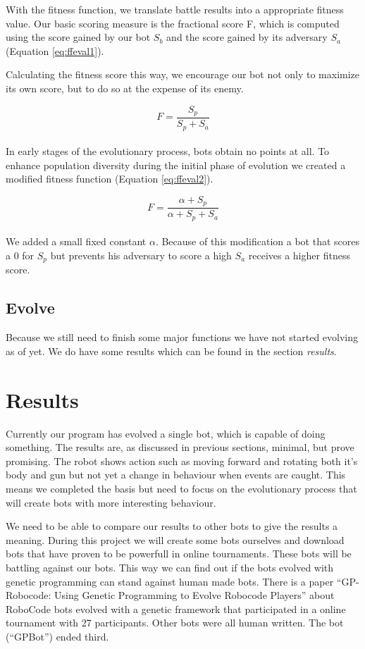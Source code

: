 \documentclass[a4paper,10pt]{article}
\begin{document}
With the fitness function, we translate battle results into a appropriate fitness value. Our basic scoring measure is the fractional score F, which is computed using the score gained by our bot $S_b$ and the score gained by its adversary $S_a$ (Equation \ref{eq:ffeval1}).

Calculating the fitness score this way, we encourage our bot not only to maximize its own score, but to do so at the expense of its enemy.

\begin{equation}
F = \frac{S_p}{S_p + S_a}
    \label{eq:ffeval1}
\end{equation} \\

In early stages of the evolutionary process, bots obtain no points at all. To enhance population diversity during the initial phase of evolution we created a modified fitness function (Equation \ref{eq:ffeval2}).

\begin{equation}
F = \frac{\alpha+S_p}{\alpha+S_p + S_a}
     \label{eq:ffeval2}
\end{equation} \\

We added a small fixed constant $\alpha$. Because of this modification a bot that scores a 0 for $S_p$ but prevents his adversary to score a high $S_a$ receives a higher fitness score.

\subsection{Evolve}
Because we still need to finish some major functions we have not started evolving as of yet. We do have some results which can be found in the section \textit{results}. 

\section{Results}
Currently our program has evolved a single bot, which is capable of doing something. The results are, as discussed in previous sections, minimal, but prove promising. The robot shows action such as moving forward and rotating both it's body and gun but not yet a change in behaviour when events are caught. This means we completed the basis but need to focus on the evolutionary process that will create bots with more interesting behaviour.

We need to be able to compare our results to other bots to give the results a meaning. During this project we will create some bots ourselves and download bots that have proven to be powerfull in online tournaments. These bots will be battling against our bots. This way we can find out if the bots evolved with genetic programming can stand against human made bots. There is a paper ``GP-Robocode: Using Genetic Programming to Evolve Robocode Players'' \cite{shichel} about RoboCode bots evolved with a genetic framework that participated in a online tournament with 27 participants. Other bots were all human written. The bot (``GPBot'') ended third.
\end{document}
